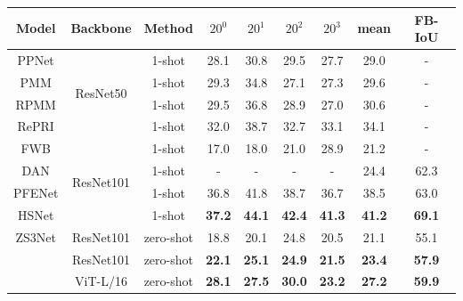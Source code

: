 \begin{tabular}{c|c|c|cccccc}
\toprule 

Model&Backbone&Method& $20^0$ & $20^1$ & $20^2$ & $20^3$ &mean&FB-IoU \\  
\midrule\midrule
PPNet&\multirow{4}{*}{ResNet50}&1-shot&28.1& 30.8& 29.5 &27.7&  29.0 & - \\
PMM&&1-shot&29.3 &34.8& 27.1 &27.3&  29.6& -  \\
RPMM&&1-shot&29.5& 36.8& 28.9& 27.0&   30.6 &- \\
RePRI&&1-shot&32.0& 38.7& 32.7& 33.1 & 34.1 & - \\
\midrule
FWB&\multirow{4}{*}{ResNet101}&1-shot&17.0 &18.0 &21.0 &28.9&  21.2 &- \\
DAN&&1-shot&-&-&-&-&24.4& 62.3 \\
PFENet&&1-shot&36.8 & 41.8& 38.7& 36.7 &38.5 & 63.0 \\
HSNet&&1-shot&\textbf{37.2}& \textbf{44.1}& \textbf{42.4}& \textbf{41.3}&  \textbf{41.2}  &\textbf{69.1} \\
\midrule
ZS3Net&ResNet101&zero-shot&18.8&20.1&24.8&20.5&  21.1	&55.1 \\
\midrule
\methodname{} &ResNet101&zero-shot&\textbf{22.1}&\textbf{25.1}&\textbf{24.9}&\textbf{21.5}&\textbf{23.4}&\textbf{57.9} \\

\methodname{} &ViT-L/16&zero-shot&\textbf{28.1}&\textbf{27.5}&\textbf{30.0}&\textbf{23.2}&\textbf{27.2}  &\textbf{59.9} \\
\bottomrule
\end{tabular}
\caption{Comparison of mIoU and FB-IoU (higher is better) on COCO-$20^i$. }
